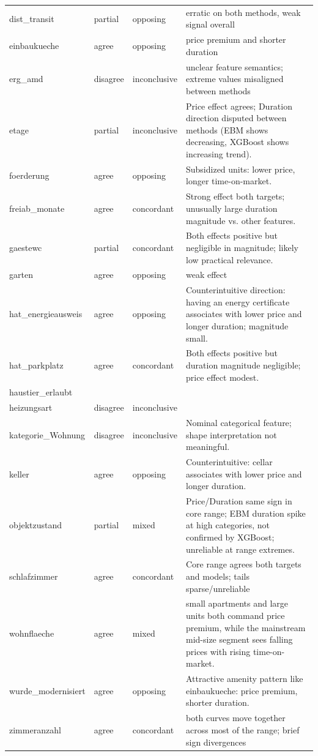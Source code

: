 \begin{table}
\begin{tabular}{lll}
dist_transit & partial & opposing & erratic on both methods, weak signal overall \\
einbaukueche & agree & opposing & price premium and shorter duration \\
erg_amd & disagree & inconclusive & unclear feature semantics; extreme values misaligned between methods \\
etage & partial & inconclusive & Price effect agrees; Duration direction disputed between methods (EBM shows decreasing, XGBoost shows increasing trend). \\
foerderung & agree & opposing & Subsidized units: lower price, longer time-on-market. \\
freiab_monate & agree & concordant & Strong effect both targets; unusually large duration magnitude vs. other features. \\
gaestewc & partial & concordant & Both effects positive but negligible in magnitude; likely low practical relevance. \\
garten & agree & opposing & weak effect \\
hat_energieausweis & agree & opposing & Counterintuitive direction: having an energy certificate associates with lower price and longer duration; magnitude small. \\
hat_parkplatz & agree & concordant & Both effects positive but duration magnitude negligible; price effect modest. \\
haustier_erlaubt &  &  &  \\
heizungsart & disagree & inconclusive &  \\
kategorie_Wohnung & disagree & inconclusive & Nominal categorical feature; shape interpretation not meaningful. \\
keller & agree & opposing & Counterintuitive: cellar associates with lower price and longer duration. \\
objektzustand & partial & mixed & Price/Duration same sign in core range; EBM duration spike at high categories, not confirmed by XGBoost; unreliable at range extremes. \\
schlafzimmer & agree & concordant & Core range agrees both targets and models; tails sparse/unreliable \\
wohnflaeche & agree & mixed & small apartments and large units both command price premium, while the mainstream mid-size segment sees falling prices with rising time-on-market. \\
wurde_modernisiert & agree & opposing & Attractive amenity pattern like einbaukueche: price premium, shorter duration. \\
zimmeranzahl & agree & concordant & both curves move together across most of the range; brief sign divergences \\

\bottomrule
\end{tabular}
\end{table}
